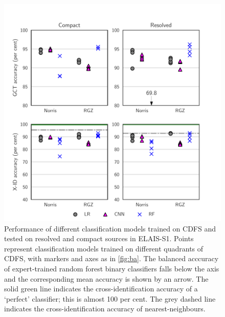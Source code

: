 \documentclass[fleqn,usenatbib,usedcolumn]{mnras}
\begin{document}
  \begin{figure}
  \centering
  \includegraphics[]{images/elais-grid-new.pdf}
  \caption{Performance of different classification models trained on CDFS and tested on
  resolved and compact sources in ELAIS-S1. Points represent classification models
  trained on different quadrants of CDFS, with markers and axes as in
  \autoref{fig:ba}. The balanced acccuracy of expert-trained random forest
  binary classifiers falls below the axis and the corresponding mean accuracy is
  shown by an arrow. The solid green line indicates the cross-identification
  accuracy of a `perfect' classifier; this is almost 100 per cent. The grey
  dashed line indicates the cross-identification accuracy of
  nearest-neighbours.
    \label{fig:elais-ba}}
  \end{figure}
\end{document}
